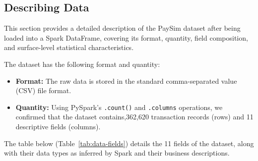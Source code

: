 \documentclass[sigplan,screen]{acmart}
\begin{document}
\subsection{Describing Data}

This section provides a detailed description of the PaySim dataset after being loaded into a Spark DataFrame, covering its format, quantity, field composition, and surface-level statistical characteristics.

The dataset has the following format and quantity:
\begin{itemize}
\item \textbf{Format:} The raw data is stored in the standard comma-separated value (CSV) file format.
\item \textbf{Quantity:} Using PySpark's \texttt{.count()} and \texttt{.columns} operations, we confirmed that the dataset contains,362,620 transaction records (rows) and 11 descriptive fields (columns).
\end{itemize}

The table below (Table~\ref{tab:data-fields}) details the 11 fields of the dataset, along with their data types as inferred by Spark and their business descriptions.
\end{document}
